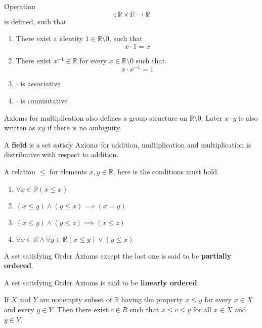 \documentclass[letter]{article}
\newcommand{\R}{\mathbb{R}}
\newenvironment{definition}[1][Definition]{\begin{trivlist}
\item[\hskip \labelsep {\bfseries #1}]}{\end{trivlist}}
\begin{document}
\begin{axi}
Operation 
\[
\cdot: \R \times \R \to \R
\]
 is defined, such that
\begin{enumerate}
\item There exist a identity $1\in \R \setminus 0$, such that
\[
x\cdot 1 = x
\]
\item There exist $x^{-1} \in \R$ for every $x\in \R \setminus 0$ such that
\[
x\cdot x^{-1} = 1
\]
\item $\cdot$ is associative
\item $\cdot$ is commutative
\end{enumerate}
\end{axi}

Axioms for multiplication also defines a group structure on $\R \setminus 0$. Later $x\cdot y$ is also written as $xy$ if there is no ambiguity.

\begin{definition}
A \textbf{field} is a set satisfy Axioms for addition, multiplication and multiplication is distributive with respect to addition.
\end{definition}

\begin{axi}
A relation $\leq$ for elements $x,y\in \R$, here is the conditions must hold.
\begin{enumerate}
\item $\forall x \in \R (x\leq x)$
\item $(x\leq y) \wedge (y\leq x) \implies (x=y)$
\item $(x\leq y) \wedge (y\leq z) \implies (x\leq z)$
\item $\forall x \in \R \wedge \forall y \in \R (x\leq y) \vee (y \leq x)$
\end{enumerate}
\end{axi}

\begin{definition}
A set satisfying Order Axioms except the last one is said to be \textbf{partially ordered}.
\end{definition}

\begin{definition}
A set satisfying Order Axioms is said to be \textbf{linearly ordered}.
\end{definition}

\begin{axi}
If $X$ and $Y$ are nonempty subset of $\R$ having the property $x \leq y$ for every $x \in X$ and every $y\in Y$. Then there exist $c\in R$ such that $x\leq c\leq y$ for all $x \in X$ and $y \in Y$.
\end{axi}
\end{document}
